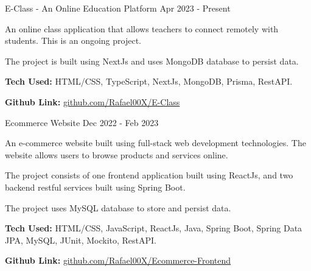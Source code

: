 

\begin{cventries}

  \cventry
    {} %
    {E-Class - An Online Education Platform} %
    {Apr 2023 - Present} %
    {} %
    {
      \begin{cvitems} %
        \item {An online class application that allows teachers to connect remotely with students. This is an ongoing project.}
        \item {The project is built using NextJs and uses MongoDB database to persist data.}
        \item {\textbf{Tech Used:} HTML/CSS, TypeScript, NextJs, MongoDB, Prisma, RestAPI.}
        \item {\textbf{Github Link:} \href{https://github.com/Rafael00X/E-Class}{github.com/Rafael00X/E-Class}}
      \end{cvitems}
    }


  \cventry
    {} %
    {Ecommerce Website} %
    {Dec 2022 - Feb 2023} %
    {} %
    {
      \begin{cvitems} %
        \item {An e-commerce website built using full-stack web development technologies. The website allows users to browse products and services online.}
        \item {The project consists of one frontend application built using ReactJs, and two backend restful services built using Spring Boot.}
        \item {The project uses MySQL database to store and persist data.}
        \item {\textbf{Tech Used:} HTML/CSS, JavaScript, ReactJs, Java, Spring Boot, Spring Data JPA, MySQL, JUnit, Mockito, RestAPI.}
        \item {\textbf{Github Link:} \href{https://github.com/Rafael00X/Ecommerce-Frontend}{github.com/Rafael00X/Ecommerce-Frontend}}
      \end{cvitems}
    }



\end{cventries}
